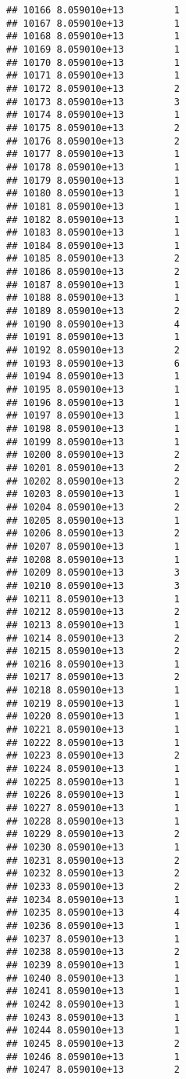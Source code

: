 \documentclass[
]{article}
\begin{document}
\begin{verbatim}
## 10166 8.059010e+13         1
## 10167 8.059010e+13         1
## 10168 8.059010e+13         1
## 10169 8.059010e+13         1
## 10170 8.059010e+13         1
## 10171 8.059010e+13         1
## 10172 8.059010e+13         2
## 10173 8.059010e+13         3
## 10174 8.059010e+13         1
## 10175 8.059010e+13         2
## 10176 8.059010e+13         2
## 10177 8.059010e+13         1
## 10178 8.059010e+13         1
## 10179 8.059010e+13         1
## 10180 8.059010e+13         1
## 10181 8.059010e+13         1
## 10182 8.059010e+13         1
## 10183 8.059010e+13         1
## 10184 8.059010e+13         1
## 10185 8.059010e+13         2
## 10186 8.059010e+13         2
## 10187 8.059010e+13         1
## 10188 8.059010e+13         1
## 10189 8.059010e+13         2
## 10190 8.059010e+13         4
## 10191 8.059010e+13         1
## 10192 8.059010e+13         2
## 10193 8.059010e+13         6
## 10194 8.059010e+13         1
## 10195 8.059010e+13         1
## 10196 8.059010e+13         1
## 10197 8.059010e+13         1
## 10198 8.059010e+13         1
## 10199 8.059010e+13         1
## 10200 8.059010e+13         2
## 10201 8.059010e+13         2
## 10202 8.059010e+13         2
## 10203 8.059010e+13         1
## 10204 8.059010e+13         2
## 10205 8.059010e+13         1
## 10206 8.059010e+13         2
## 10207 8.059010e+13         1
## 10208 8.059010e+13         1
## 10209 8.059010e+13         3
## 10210 8.059010e+13         3
## 10211 8.059010e+13         1
## 10212 8.059010e+13         2
## 10213 8.059010e+13         1
## 10214 8.059010e+13         2
## 10215 8.059010e+13         2
## 10216 8.059010e+13         1
## 10217 8.059010e+13         2
## 10218 8.059010e+13         1
## 10219 8.059010e+13         1
## 10220 8.059010e+13         1
## 10221 8.059010e+13         1
## 10222 8.059010e+13         1
## 10223 8.059010e+13         2
## 10224 8.059010e+13         1
## 10225 8.059010e+13         1
## 10226 8.059010e+13         1
## 10227 8.059010e+13         1
## 10228 8.059010e+13         1
## 10229 8.059010e+13         2
## 10230 8.059010e+13         1
## 10231 8.059010e+13         2
## 10232 8.059010e+13         2
## 10233 8.059010e+13         2
## 10234 8.059010e+13         1
## 10235 8.059010e+13         4
## 10236 8.059010e+13         1
## 10237 8.059010e+13         1
## 10238 8.059010e+13         2
## 10239 8.059010e+13         1
## 10240 8.059010e+13         1
## 10241 8.059010e+13         1
## 10242 8.059010e+13         1
## 10243 8.059010e+13         1
## 10244 8.059010e+13         1
## 10245 8.059010e+13         2
## 10246 8.059010e+13         1
## 10247 8.059010e+13         2

\end{verbatim}
\end{document}
